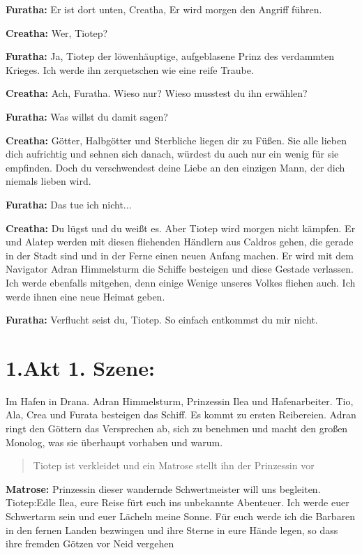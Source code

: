 \documentclass[a5paper,6pt]{book}
\begin{document}
\textbf{Furatha:} Er ist dort unten, Creatha, Er wird morgen den Angriff führen.

\textbf{Creatha:} Wer, Tiotep?

\textbf{Furatha:} Ja, Tiotep der löwenhäuptige, aufgeblasene Prinz des verdammten Krieges. Ich
werde ihn zerquetschen wie eine reife Traube.

\textbf{Creatha:} Ach, Furatha. Wieso nur? Wieso musstest du ihn erwählen?

\textbf{Furatha:} Was willst du damit sagen?

\textbf{Creatha:} Götter, Halbgötter und Sterbliche liegen dir zu Füßen. Sie alle lieben dich aufrichtig
und sehnen sich danach, würdest du auch nur ein wenig für sie empfinden. Doch du
verschwendest deine Liebe an den einzigen Mann, der dich niemals lieben wird.

\textbf{Furatha:} Das tue ich nicht...

\textbf{Creatha:} Du lügst und du weißt es. Aber Tiotep wird morgen nicht kämpfen. Er und Alatep
werden mit diesen fliehenden Händlern aus Caldros gehen, die gerade in der Stadt
sind und in der Ferne einen neuen Anfang machen. Er wird mit dem Navigator Adran
Himmelsturm die Schiffe besteigen und diese Gestade verlassen. Ich werde ebenfalls
mitgehen, denn einige Wenige unseres Volkes fliehen auch. Ich werde ihnen eine neue
Heimat geben.

\textbf{Furatha:} Verflucht seist du, Tiotep. So einfach entkommst du mir nicht.

\section{1.Akt 1. Szene:}

Im Hafen in Drana. Adran Himmelsturm, Prinzessin Ilea und Hafenarbeiter. Tio, Ala, Crea
und Furata besteigen das Schiff. Es kommt zu ersten Reibereien. Adran ringt den Göttern
das Versprechen ab, sich zu benehmen und macht den großen Monolog, was sie überhaupt
vorhaben und warum.

\begin{quote}
Tiotep ist verkleidet und ein Matrose stellt ihn der Prinzessin vor
\end{quote}


\textbf{Matrose:} Prinzessin dieser wandernde Schwertmeister will uns begleiten.
Tiotep:Edle Ilea, eure Reise fürt euch ins unbekannte Abenteuer. Ich werde euer Schwertarm
sein und euer Lächeln meine Sonne. Für euch werde ich die Barbaren in den fernen
Landen bezwingen und ihre Sterne in eure Hände legen, so dass ihre fremden Götzen
vor Neid vergehen
\end{document}
